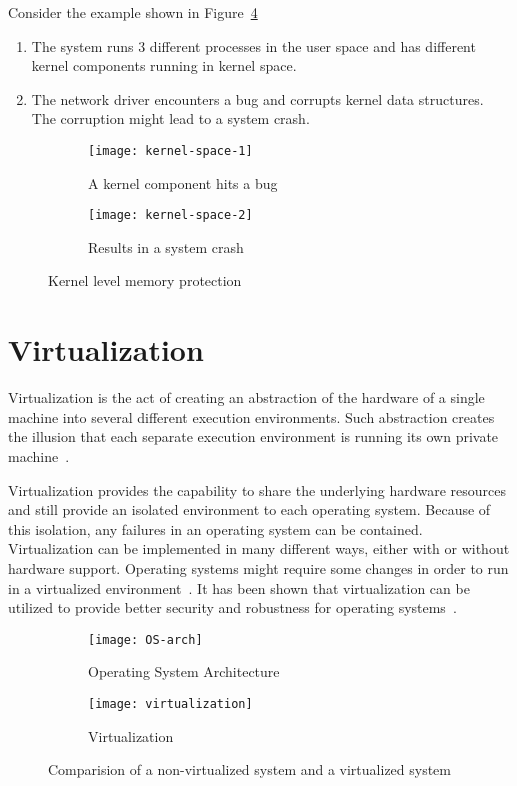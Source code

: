Consider the example shown in Figure~\ref{fig:Kernel space}
\begin{enumerate}
\item The system runs 3 different processes in the user space and has
different kernel components running in kernel space.

\item The network driver encounters a bug and corrupts kernel data
structures. The corruption might lead to a system crash.

\end{enumerate}
\begin{figure}[!ht]
    \centering
    \begin{subfigure}[b]{0.49\textwidth}
	\texttt{[image: kernel-space-1]}
	\caption{A kernel component hits a bug}
    \end{subfigure}
	\hfill
    \begin{subfigure}[b]{0.49\textwidth}
	\texttt{[image: kernel-space-2]}
	\caption{Results in a system crash}
    \end{subfigure}
    \caption{Kernel level memory protection}\label{fig:Kernel space}
\end{figure}

\section{Virtualization}

Virtualization is the act of creating an abstraction of the hardware
of a single machine into several different execution environments. Such
abstraction creates the illusion that each separate execution environment
is running its own private machine~\cite{Galvin}.

Virtualization provides the capability to share the underlying hardware
resources and still provide an isolated environment to each operating
system. Because of this isolation, any failures in an operating
system can be contained. Virtualization can be implemented in many
different ways, either with or without hardware support. Operating
systems might require some changes in order to run in a virtualized
environment~\cite{Drepper:2008:CV:1348583.1348591}. It has been
shown that virtualization can be utilized to provide better security
and robustness for operating systems~\cite{Fraser04safehardware,
LeVasseur04UnmodifiedDriverReuse, Riley:2008:GPK:1433006.1433008}.

\begin{figure}[!ht]
    \centering
    \begin{subfigure}[b]{0.49\textwidth}
	\texttt{[image: OS-arch]}
	\caption{Operating System Architecture}
	\label{fig:OS}
    \end{subfigure}
	\hfill
    \begin{subfigure}[b]{0.49\textwidth}
	\texttt{[image: virtualization]}
	\caption{Virtualization}
	\label{fig:Virtualization}
	\end{subfigure}
    \caption{Comparision of a non-virtualized system and a virtualized system}\label{fig:Kernel space}
\end{figure}

